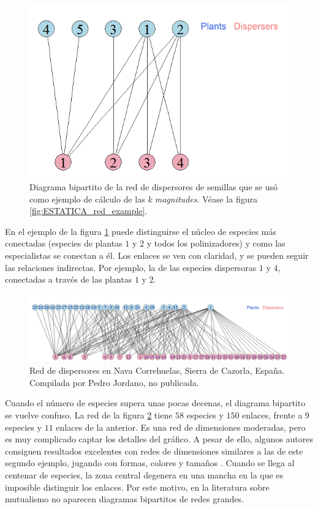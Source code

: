 \begin{figure}[h!]
\centering
\includegraphics[scale=0.35]{Figures/VIS_SD_030_bipartita.png}
\caption{Diagrama bipartito de la red de dispersores de semillas que se usó como ejemplo de cálculo de las \textit{k magnitudes}. Véase la figura \ref{fig:ESTATICA_red_example}.}
\label{fig:Figures/VIS_SD_030_bipartita}
\end{figure}

En el ejemplo de la figura \ref{fig:Figures/VIS_SD_030_bipartita} puede distinguirse el núcleo de especies más conectadas (especies de plantas $1$ y $2$ y todos los polinizadores) y como las especialistas se conectan a él. Los enlaces se ven con claridad, y se pueden seguir las relaciones indirectas. Por ejemplo, la de las especies dispersoras $1$ y $4$, conectadas a través de las plantas $1$ y $2$. 

\begin{figure}[h!]
\centering
\includegraphics[scale=0.4]{Figures/VIS_bipartito_SD_020.png}
\caption{Red de dispersores en Nava Correhuelas, Sierra de Cazorla, España. Compilada por Pedro Jordano, no publicada.}
\label{fig:VIS_bipartito_SD_020}
\end{figure}

Cuando el número de especies supera unas pocas decenas, el diagrama bipartito se vuelve confuso. La red de la figura \ref{fig:VIS_bipartito_SD_020} tiene $58$ especies y $150$ enlaces, frente a $9$ especies y $11$ enlaces de la anterior. Es una red de dimensiones moderadas, pero es muy complicado captar los detalles del gráfico. A pesar de ello, algunos autores consiguen resultados excelentes con redes de dimensiones similares a las de este segundo ejemplo, jugando con formas, colores y tamaños \cite{dakos2014critical}. Cuando se llega al centenar de especies, la zona central degenera en una mancha en la que es imposible distinguir los enlaces. Por este motivo, en la literatura sobre mutualismo no aparecen diagramas bipartitos de redes grandes. 


